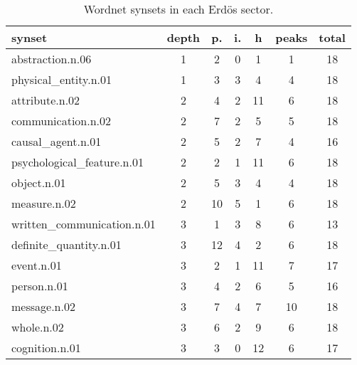 \begin{table}[h!]
\begin{center}
\begin{tabular}{| l || c | c | c | c | c | c |}\hline
{\bf synset} & {\bf depth} & {\bf p.} & {\bf i.} & {\bf h} & {\bf peaks} & total \\\hline\hline
abstraction.n.06 & 1  & 2  & 0  & 1  & 1  & 18 \\
physical\_entity.n.01 & 1  & 3  & 3  & 4  & 4  & 18 \\\hline
attribute.n.02 & 2  & 4  & 2  & 11  & 6  & 18 \\
communication.n.02 & 2  & 7  & 2  & 5  & 5  & 18 \\
causal\_agent.n.01 & 2  & 5  & 2  & 7  & 4  & 16 \\
psychological\_feature.n.01 & 2  & 2  & 1  & 11  & 6  & 18 \\
object.n.01 & 2  & 5  & 3  & 4  & 4  & 18 \\
measure.n.02 & 2  & 10  & 5  & 1  & 6  & 18 \\\hline
written\_communication.n.01 & 3  & 1  & 3  & 8  & 6  & 13 \\
definite\_quantity.n.01 & 3  & 12  & 4  & 2  & 6  & 18 \\
event.n.01 & 3  & 2  & 1  & 11  & 7  & 17 \\
person.n.01 & 3  & 4  & 2  & 6  & 5  & 16 \\
message.n.02 & 3  & 7  & 4  & 7  & 10  & 18 \\
whole.n.02 & 3  & 6  & 2  & 9  & 6  & 18 \\
cognition.n.01 & 3  & 3  & 0  & 12  & 6  & 17 \\\hline
\end{tabular}
\caption{Wordnet synsets in each Erd\"os sector.}
\end{center}
\end{table}